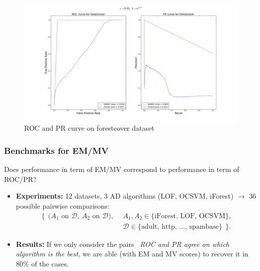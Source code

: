 \documentclass[9pt]{beamer}
\newcommand{\st}{\text{\emph{s.t.}}{}}
\begin{document}
\begin{frame}
\begin{figure}[H]
  \centering
  \includegraphics[width = 1. \textwidth]{forestcover-semi-supervised-average-rect-01}
  \caption{ROC and PR curve on forestcover dataset}
  \label{forestcover}
\end{figure}
\end{frame}









\begin{frame}
\frametitle{Benchmarks for EM/MV}
\begin{block}{Does performance in term of EM/MV correspond to performance in term of ROC/PR?}

\begin{itemize}
\item \textbf{Experiments:}
{\small
12 datasets, 3 AD algorithms (LOF, OCSVM, iForest)
$\to$ 36 possible pairwise comparisons:
\begin{align*}
\bigg\{~~\Big(A_1 \text{~on~} \mathcal{D},~ A_2 \text{~on~} \mathcal{D}\Big),~~ & A_1, A_2 \in \{\text{iForest, LOF, OCSVM}\}, \\
& \mathcal{D} \in \{\text{adult, http, \ldots, spambase}\} ~~\bigg\}.
\end{align*}
}


\item \textbf{Results:}
{ \small
If we only consider the pairs \st~\emph{ROC and PR agree on which algorithm is the best}, we are able (with EM and MV scores) to recover it in $80\%$ of the cases.
}
\end{itemize}


\end{block}
\end{frame}
\end{document}
